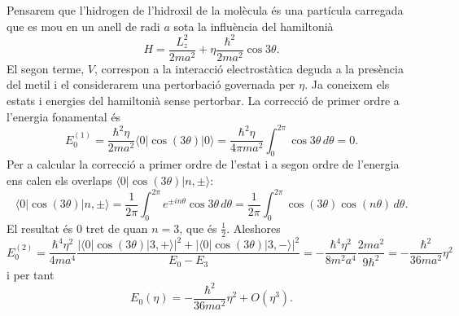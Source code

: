 \documentclass[12pt]{article}
\numberwithin{table}{section}
\numberwithin{figure}{section}
\newcommand{\abs}[1]{\lvert #1 \rvert}
\newcommand{\ket}[1]{\vert {#1} \rangle}
\newcommand{\bra}[1]{\langle #1 \vert}
\begin{document}
Pensarem que l'hidrogen de l'hidroxil de la molècula és una partícula carregada que es mou en un anell de radi \( a \) sota la influència del hamiltonià
\begin{equation*}
	H = \frac{L_z^2}{2ma^2} + \eta\frac{\hbar^2}{2ma^2}\cos{3\theta}.
\end{equation*}
El segon terme, \( V \), correspon a la interacció electrostàtica deguda a la presència del metil i el considerarem una pertorbació governada per \( \eta \). Ja coneixem els estats i energies del hamiltonià sense pertorbar. La correcció de primer ordre a l'energia fonamental és
\begin{equation*}
	E_0^{(1)} = \frac{\hbar^2 \eta}{2ma^2}\bra{0}\cos{(3\theta)}\ket{0} = \frac{\hbar^2 \eta}{4\pi ma^2}\int_0^{2\pi} \cos{3\theta} \, d\theta = 0.
\end{equation*}
Per a calcular la correcció a primer ordre de l'estat i a segon ordre de l'energia ens calen els overlaps \( \bra{0}\cos{(3\theta)}\ket{n,\pm} \):
\begin{equation*}
	\bra{0}\cos{(3\theta)}\ket{n,\pm} = \frac{1}{2\pi} \int_0^{2\pi}e^{\pm in\theta}\cos{3\theta}\,d\theta = \frac{1}{2\pi} \int_0^{2\pi}\cos{(3\theta)}\cos{(n\theta)} \,d\theta.
\end{equation*}
El resultat és 0 tret de quan \( n = 3 \), que és \( \frac{1}{2} \). Aleshores
\begin{equation*}
	E_0^{(2)} = \frac{\hbar^4\eta^2}{4ma^4}\frac{\abs{\bra{0}\cos{(3\theta)}\ket{3,+}}^2 + \abs{\bra{0}\cos{(3\theta)}\ket{3,-}}^2}{E_0 - E_3} = -\frac{\hbar^4\eta^2}{8m^2a^4}\frac{2ma^2}{9\hbar^2} = - \frac{\hbar^2}{36ma^2}\eta^2
\end{equation*}
i per tant
\begin{equation*}
	E_0(\eta) = -\frac{\hbar^2}{36ma^2}\eta^2 + O(\eta^3).
\end{equation*}
\end{document}
